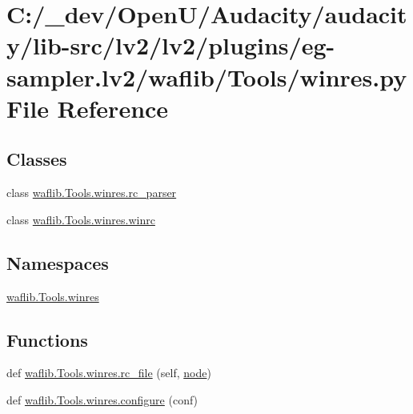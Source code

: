 \hypertarget{lv2_2plugins_2eg-sampler_8lv2_2waflib_2_tools_2winres_8py}{}\section{C\+:/\+\_\+dev/\+Open\+U/\+Audacity/audacity/lib-\/src/lv2/lv2/plugins/eg-\/sampler.lv2/waflib/\+Tools/winres.py File Reference}
\label{lv2_2plugins_2eg-sampler_8lv2_2waflib_2_tools_2winres_8py}
\subsection*{Classes}
\begin{DoxyCompactItemize}
\item 
class \hyperlink{classwaflib_1_1_tools_1_1winres_1_1rc__parser}{waflib.\+Tools.\+winres.\+rc\+\_\+parser}
\item 
class \hyperlink{classwaflib_1_1_tools_1_1winres_1_1winrc}{waflib.\+Tools.\+winres.\+winrc}
\end{DoxyCompactItemize}
\subsection*{Namespaces}
\begin{DoxyCompactItemize}
\item 
 \hyperlink{namespacewaflib_1_1_tools_1_1winres}{waflib.\+Tools.\+winres}
\end{DoxyCompactItemize}
\subsection*{Functions}
\begin{DoxyCompactItemize}
\item 
def \hyperlink{namespacewaflib_1_1_tools_1_1winres_ac3e0ca77b048ed70a3403f4bbda55f9e}{waflib.\+Tools.\+winres.\+rc\+\_\+file} (self, \hyperlink{structnode}{node})
\item 
def \hyperlink{namespacewaflib_1_1_tools_1_1winres_a61d49dde1a942da70092bb59fe817f18}{waflib.\+Tools.\+winres.\+configure} (conf)
\end{DoxyCompactItemize}

